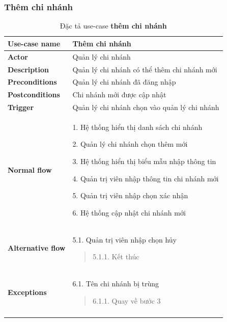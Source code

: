 \subsubsection{Thêm chi nhánh}
{
    \setlength\extrarowheight{6pt}
    \begin{longtable}{| p{} | p{} |}
        \hline
        \textbf{Use-case name}
         &
        Thêm chi nhánh
        \\
        \hline
        \textbf{Actor}
         &
        Quản lý chi nhánh
        \\
        \hline
        \textbf{Description}
         &
        Quản lý chi nhánh có thể thêm chi nhánh mới
        \\
        \hline
        \textbf{Preconditions}
         &
        Quản lý chi nhánh đã đăng nhập
        \\
        \hline
        \textbf{Postconditions}
         &
        Chi nhánh mới được cập nhật
        \\
        \hline
        \textbf{Trigger}
         &
        Quản lý chi nhánh chọn vào quản lý chi nhánh
        \\
        \hline
        \begin{flushleft}
            \textbf{Normal flow}
        \end{flushleft}
         &
        1. Hệ thống hiển thị danh sách chi nhánh

        2. Quản lý chi nhánh chọn thêm mới

        3. Hệ thống hiển thị biểu mẫu nhập thông tin

        4. Quản trị viên nhập thông tin chi nhánh mới

        5. Quản trị viên nhập chọn xác nhận

        6. Hệ thống cập nhật chi nhánh mới
        \\
        \hline
        \begin{flushleft}
            \textbf{Alternative flow}
        \end{flushleft}
         &
        5.1. Quản trị viên nhập chọn hủy
        \begin{quote}
            5.1.1. Kết thúc
        \end{quote}
        \\
        \hline
        \begin{flushleft}
            \textbf{Exceptions}
        \end{flushleft}
         &
        6.1. Tên chi nhánh bị trùng
        \begin{quote}
            6.1.1. Quay về bước 3
        \end{quote}
        \\
        \hline
        \caption{Đặc tả use-case \textbf{thêm chi nhánh}}
    \end{longtable}
}
